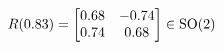 \documentclass[preview]{standalone}
\begin{document}
\begin{align*}
\special{dvisvgm:raw <g id='unique000'>}R(0.83) = \begin{bmatrix} 0.68 & -0.74 \\ 0.74 & 0.68 \end{bmatrix} \in \text{SO}(2)\special{dvisvgm:raw </g>}
\end{align*}
\end{document}
